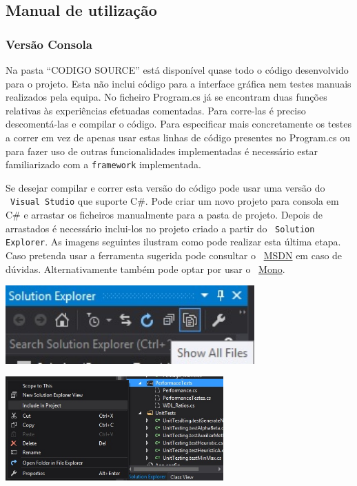 
\subsection{Manual de utilização}

\subsubsection{Vers\~ao Consola}

Na pasta ``CODIGO SOURCE'' está disponível quase todo o código desenvolvido para o projeto. Esta n\~ao inclui código para a interface gráfica nem testes manuais realizados pela equipa. No ficheiro Program.cs já se encontram duas funções relativas às experiências efetuadas comentadas. Para corre-las é preciso descomentá-las e compilar o código. Para especificar mais concretamente os testes a correr em vez de apenas usar estas linhas de código presentes no Program.cs ou para fazer uso de outras funcionalidades implementadas é necessário estar familiarizado com a \verb|framework| implementada. 

Se desejar compilar e correr esta versão do código pode usar uma versão do ~\verb|Visual Studio| que suporte C\#. Pode criar um novo projeto para consola em C\# e arrastar os ficheiros manualmente para a pasta de projeto. Depois de arrastados é necessário inclui-los no projeto criado a partir do ~\verb|Solution Explorer|. As imagens seguintes ilustram como pode realizar esta última etapa. Caso pretenda usar a ferramenta sugerida pode consultar o ~\href{https://msdn.microsoft.com/en-us/library/aa187916.aspx}{MSDN} em caso de dúvidas. Alternativamente também pode optar por usar o ~\href{http://www.mono-project.com/docs/about-mono/languages/csharp/}{Mono}.

\begin{table}[H]
\centering
\includegraphics[height=3cm]{user_manual/showallfiles.jpg}
\end{table}

\begin{table}[H]
\centering
\includegraphics[height=4cm]{user_manual/includestuff.jpg}
\end{table}

